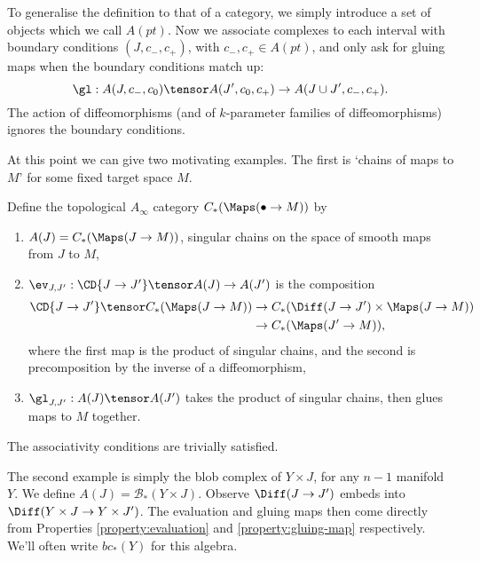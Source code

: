 \documentclass[11pt,leqno]{amsart}
\def\bc{{\mathcal B}}
\begin{document}
To generalise the definition to that of a category, we simply introduce a set of objects which we call $A(pt)$. Now we associate complexes to each
interval with boundary conditions $(J, c_-, c_+)$, with $c_-, c_+ \in A(pt)$, and only ask for gluing maps when the boundary conditions match up:
\begin{equation*}
\gl : A(J, c_-, c_0) \tensor A(J', c_0, c_+) \to A(J \cup J', c_-, c_+).
\end{equation*}
The action of diffeomorphisms (and of $k$-parameter families of diffeomorphisms) ignores the boundary conditions.

At this point we can give two motivating examples. The first is `chains of maps to $M$' for some fixed target space $M$.
\begin{defn}
Define the topological $A_\infty$ category $C_*(\Maps(\bullet \to M))$ by
\begin{enumerate}
\item $A(J) = C_*(\Maps(J \to M))$, singular chains on the space of smooth maps from $J$ to $M$,
\item $\ev_{J,J'} : \CD{J \to J'} \tensor A(J) \to A(J')$ is the composition
\begin{align*}
\CD{J \to J'} \tensor C_*(\Maps(J \to M)) & \to C_*(\Diff(J \to J') \times \Maps(J \to M)) \\ & \to C_*(\Maps(J' \to M)),
\end{align*}
where the first map is the product of singular chains, and the second is precomposition by the inverse of a diffeomorphism,
\item $\gl_{J,J'} : A(J) \tensor A(J')$ takes the product of singular chains, then glues maps to $M$ together.
\end{enumerate}
The associativity conditions are trivially satisfied.
\end{defn}

The second example is simply the blob complex of $Y \times J$, for any $n-1$ manifold $Y$. We define $A(J) = \bc_*(Y \times J)$.
Observe $\Diff(J \to J')$ embeds into $\Diff(Y \times J \to Y \times J')$. The evaluation and gluing maps then come directly from Properties
\ref{property:evaluation} and \ref{property:gluing-map} respectively. We'll often write $bc_*(Y)$ for this algebra.
\end{document}
